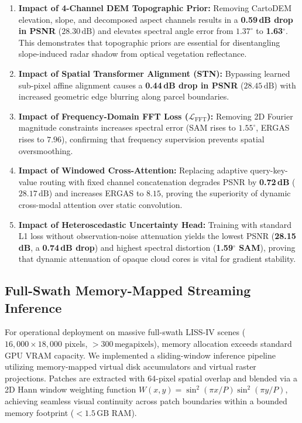 \begin{enumerate}\setlength{\itemsep}{1.5pt}\setlength{\parskip}{0pt}
    \item \textbf{Impact of 4-Channel DEM Topographic Prior:} Removing CartoDEM elevation, slope, and decomposed aspect channels results in a \textbf{0.59\,dB drop in PSNR} ($28.30\,\text{dB}$) and elevates spectral angle error from $1.37^\circ$ to \textbf{1.63$^\circ$}. This demonstrates that topographic priors are essential for disentangling slope-induced radar shadow from optical vegetation reflectance.
    \item \textbf{Impact of Spatial Transformer Alignment (STN):} Bypassing learned sub-pixel affine alignment causes a \textbf{0.44\,dB drop in PSNR} ($28.45\,\text{dB}$) with increased geometric edge blurring along parcel boundaries.
    \item \textbf{Impact of Frequency-Domain FFT Loss ($\mathcal{L}_{\text{FFT}}$):} Removing 2D Fourier magnitude constraints increases spectral error (SAM rises to $1.55^\circ$, ERGAS rises to $7.96$), confirming that frequency supervision prevents spatial oversmoothing.
    \item \textbf{Impact of Windowed Cross-Attention:} Replacing adaptive query-key-value routing with fixed channel concatenation degrades PSNR by \textbf{0.72\,dB} ($28.17\,\text{dB}$) and increases ERGAS to $8.15$, proving the superiority of dynamic cross-modal attention over static convolution.
    \item \textbf{Impact of Heteroscedastic Uncertainty Head:} Training with standard L1 loss without observation-noise attenuation yields the lowest PSNR (\textbf{28.15\,dB}, a \textbf{0.74\,dB drop}) and highest spectral distortion (\textbf{1.59$^\circ$ SAM}), proving that dynamic attenuation of opaque cloud cores is vital for gradient stability.
\end{enumerate}

\subsection{Full-Swath Memory-Mapped Streaming Inference}
For operational deployment on massive full-swath LISS-IV scenes ($16,000 \times 18,000$ pixels, $>300\,\text{megapixels}$), memory allocation exceeds standard GPU VRAM capacity. We implemented a sliding-window inference pipeline utilizing memory-mapped virtual disk accumulators and virtual raster projections. Patches are extracted with 64-pixel spatial overlap and blended via a 2D Hann window weighting function $W(x, y) = \sin^2(\pi x / P)\sin^2(\pi y / P)$, achieving seamless visual continuity across patch boundaries within a bounded memory footprint ($<1.5\,\text{GB}$ RAM).
